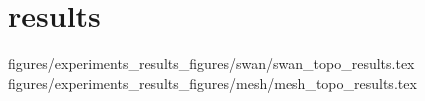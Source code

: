 
\section{results}\label{sec:results}
{figures/experiments_results_figures/swan/swan_topo_results.tex}
{figures/experiments_results_figures/mesh/mesh_topo_results.tex}